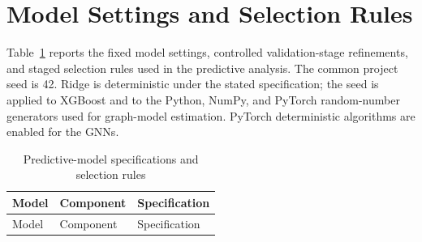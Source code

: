 \section{Model Settings and Selection Rules}
\label{app:model_specifications}

Table~\ref{tab:model-specifications} reports the fixed model settings, controlled validation-stage refinements, and staged selection rules used in the predictive analysis. The common project seed is 42. Ridge is deterministic under the stated specification; the seed is applied to XGBoost and to the Python, NumPy, and PyTorch random-number generators used for graph-model estimation. PyTorch deterministic algorithms are enabled for the GNNs.

\begingroup
\scriptsize
\setlength{\tabcolsep}{4pt}
\renewcommand{\arraystretch}{1.15}
\begin{longtable}{>{\raggedright\arraybackslash}p{}>{\raggedright\arraybackslash}p{}>{\raggedright\arraybackslash}p{}}
        \caption{Predictive-model specifications and selection rules}
        \label{tab:model-specifications}                                                                                                                                                                                                                                                                                                                                                                                                                                                                                                          \\
        \toprule
        Model & Component                                                                                                                                                                                                                                                                                                                                                                                                                                                                                                         & Specification \\
        \midrule
        \endfirsthead
        \toprule
        Model & Component                                                                                                                                                                                                                                                                                                                                                                                                                                                                                                         & Specification \\

\end{longtable}
